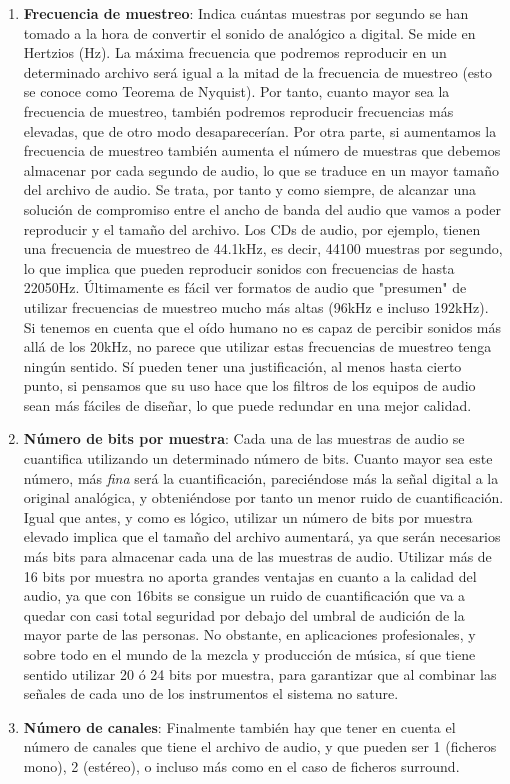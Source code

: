 \documentclass[es,practica]{uah}
\begin{document}
\begin{enumerate}
	\item {\bf Frecuencia de muestreo}: Indica cuántas muestras por segundo se han tomado a la hora de convertir el sonido de analógico a digital. Se mide en Hertzios (Hz). La máxima frecuencia que podremos reproducir en un determinado archivo será igual a la mitad de la frecuencia de muestreo (esto se conoce como Teorema de Nyquist). Por tanto, cuanto mayor sea la frecuencia de muestreo, también podremos reproducir frecuencias más elevadas, que de otro modo desaparecerían. Por otra parte, si aumentamos la frecuencia de muestreo también aumenta el número de muestras que debemos almacenar por cada segundo de audio, lo que se traduce en un mayor tamaño del archivo de audio. Se trata, por tanto y como siempre, de alcanzar una solución de compromiso entre el ancho de banda del audio que vamos a poder reproducir y el tamaño del archivo. Los CDs de audio, por ejemplo, tienen una frecuencia de muestreo de 44.1kHz, es decir, 44100 muestras por segundo, lo que implica que pueden reproducir sonidos con frecuencias de hasta 22050Hz. Últimamente es fácil ver formatos de audio que "presumen" de utilizar frecuencias de muestreo mucho más altas (96kHz e incluso 192kHz). Si tenemos en cuenta que el oído humano no es capaz de percibir sonidos más allá de los 20kHz, no parece que utilizar estas frecuencias de muestreo tenga ningún sentido. Sí pueden tener una justificación, al menos hasta cierto punto, si pensamos que su uso hace que los filtros de los equipos de audio sean más fáciles de diseñar, lo que puede redundar en una mejor calidad. 
	\item {\bf Número de bits por muestra}: Cada una de las muestras de audio se cuantifica utilizando un determinado número de bits. Cuanto mayor sea este número, más \emph{fina} será la cuantificación, pareciéndose más la señal digital a la original analógica, y obteniéndose por tanto un menor ruido de cuantificación. Igual que antes, y como es lógico, utilizar un número de bits por muestra elevado implica que el tamaño del archivo aumentará, ya que serán necesarios más bits para almacenar cada una de las muestras de audio. Utilizar más de 16 bits por muestra no aporta grandes ventajas en cuanto a la calidad del audio, ya que con 16bits se consigue un ruido de cuantificación que va a quedar con casi total seguridad por debajo del umbral de audición de la mayor parte de las personas. No obstante, en aplicaciones profesionales, y sobre todo en el mundo de la mezcla y producción de música, sí que tiene sentido utilizar 20 ó 24 bits por muestra, para garantizar que al combinar las señales de cada uno de los instrumentos el sistema no sature. 
	\item {\bf Número de canales}: Finalmente también hay que tener en cuenta el número de canales que tiene el archivo de audio, y que pueden ser 1 (ficheros mono), 2 (estéreo), o incluso más como en el caso de ficheros surround. 
\end{enumerate}
	
\end{document}
